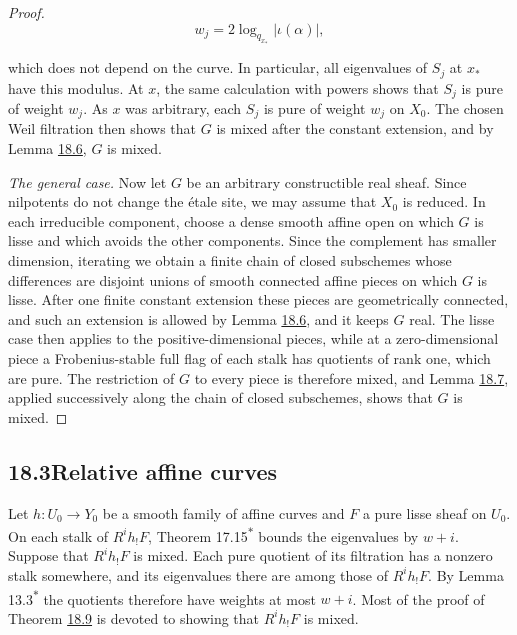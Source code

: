 \documentclass[11pt]{article}
\newcommand{\bpout}[1]{#1\textsuperscript{\hyperlink{bp-outside}{\ensuremath{\ast}}}}
\begin{document}
\begin{proof}[{Proof}]
\[
w_j=2\log_{q_{x_*}}|\iota(\alpha)|,
\]

which does not depend on the curve. In particular, all eigenvalues of \(S_j\) at \(x_*\) have this modulus. At \(x\), the same calculation with powers shows that \(S_j\) is pure of weight \(w_j\). As \(x\) was arbitrary, each \(S_j\) is pure of weight \(w_j\) on \(X_0\). The chosen Weil filtration then shows that \(G\) is mixed after the constant extension, and by Lemma \hyperref[bp21]{18.6}, \(G\) is mixed.

\emph{The general case.} Now let \(G\) be an arbitrary constructible real sheaf. Since nilpotents do not change the étale site, we may assume that \(X_0\) is reduced. In each irreducible component, choose a dense smooth affine open on which \(G\) is lisse and which avoids the other components. Since the complement has smaller dimension, iterating we obtain a finite chain of closed subschemes whose differences are disjoint unions of smooth connected affine pieces on which \(G\) is lisse. After one finite constant extension these pieces are geometrically connected, and such an extension is allowed by Lemma \hyperref[bp21]{18.6}, and it keeps \(G\) real. The lisse case then applies to the positive-dimensional pieces, while at a zero-dimensional piece a Frobenius-stable full flag of each stalk has quotients of rank one, which are pure. The restriction of \(G\) to every piece is therefore mixed, and Lemma \hyperref[bp23]{18.7}, applied successively along the chain of closed subschemes, shows that \(G\) is mixed.
\end{proof}


\subsection*{\texorpdfstring{18.3\quad Relative affine curves}{18.3 Relative affine curves}}
\label{bp27}%
\label{bp28}%
Let \(h:U_0\to Y_0\) be a smooth family of affine curves and \(F\) a pure lisse sheaf on \(U_0\). On each stalk of \(R^ih_!F\), Theorem \bpout{17.15} bounds the eigenvalues by \(w+i\). Suppose that \(R^ih_!F\) is mixed. Each pure quotient of its filtration has a nonzero stalk somewhere, and its eigenvalues there are among those of \(R^ih_!F\). By Lemma \bpout{13.3} the quotients therefore have weights at most \(w+i\). Most of the proof of Theorem \hyperref[bp29]{18.9} is devoted to showing that \(R^ih_!F\) is mixed.
\end{document}
